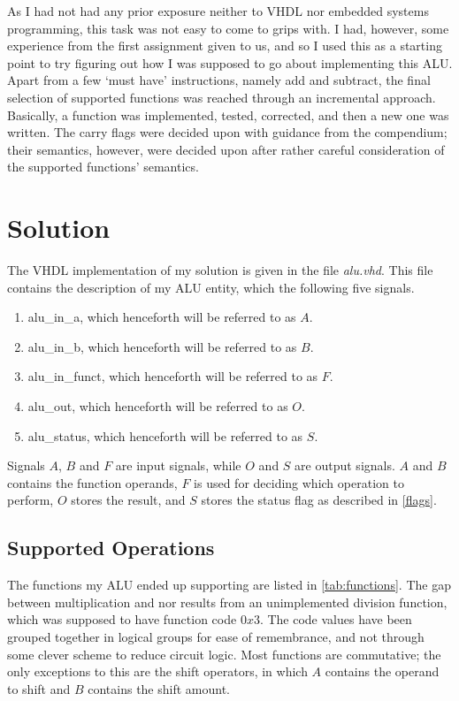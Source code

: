 \documentclass{article}
\begin{document}
As I had not had any prior exposure neither to VHDL nor embedded systems programming, this task was not easy to come to grips with. I had, however, some experience from the first assignment given to us, and so I used this as a starting point to try figuring out how I was supposed to go about implementing this ALU. Apart from a few `must have' instructions, namely add and subtract, the final selection of supported functions was reached through an incremental approach. Basically, a function was implemented, tested, corrected, and then a new one was written. The carry flags were decided upon with guidance from the compendium; their semantics, however, were decided upon after rather careful consideration of the supported functions' semantics. 

\section{Solution}
\label{sec:solution}
The VHDL implementation of my solution is given in the file \emph{alu.vhd}. This file contains the description of my ALU entity, which the following five signals.

\begin{enumerate} 
\item alu\_in\_a, which henceforth will be referred to as $A$.
\item alu\_in\_b, which henceforth will be referred to as $B$.
\item alu\_in\_funct, which henceforth will be referred to as $F$.
\item alu\_out, which henceforth will be referred to as $O$.
\item alu\_status, which henceforth will be referred to as $S$.
\end{enumerate}

Signals $A$, $B$ and $F$ are input signals, while $O$ and $S$ are output signals. $A$ and $B$ contains the function operands, $F$ is used for deciding which operation to perform, $O$ stores the result, and $S$ stores the status flag as described in \autoref{flags}.

\subsection{Supported Operations}
\label{subsec:ops}
The functions my ALU ended up supporting are listed in \autoref{tab:functions}. The gap between multiplication and nor results from an unimplemented division function, which was supposed to have function code $0x3$. The code values have been grouped together in logical groups for ease of remembrance, and not through some clever scheme to reduce circuit logic. Most functions are commutative; the only exceptions to this are the shift operators, in which $A$ contains the operand to shift and $B$ contains the shift amount.
\end{document}
